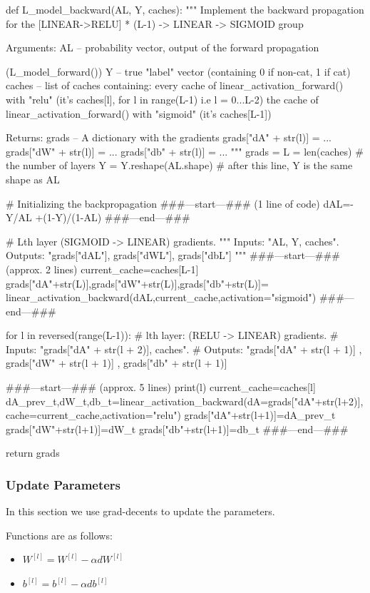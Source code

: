 \documentclass[12pt,a4paper]{article}
\begin{document}
		\begin{python}
			def L_model_backward(AL, Y, caches):
			"""
			Implement the backward propagation for the [LINEAR->RELU] * (L-1) -> LINEAR -> SIGMOID group
			
			Arguments:
			AL -- probability vector, output of the forward propagation 
			
			(L_model_forward())
			Y -- true "label" vector (containing 0 if non-cat, 1 if cat)
			caches -- list of caches containing:
			every cache of linear_activation_forward() with "relu" 
			(it's caches[l], for l in range(L-1) i.e l = 0...L-2)
			the cache of linear_activation_forward() with "sigmoid" 
			(it's caches[L-1])
			
			Returns:
			grads -- A dictionary with the gradients
			grads["dA" + str(l)] = ...
			grads["dW" + str(l)] = ...
			grads["db" + str(l)] = ...
			"""
			grads = {}
			L = len(caches) # the number of layers
			Y = Y.reshape(AL.shape) # after this line, Y is the same shape as AL
			
			# Initializing the backpropagation
			###---start---### (1 line of code)
			dAL=-Y/AL +(1-Y)/(1-AL)
			###---end---###
			
			# Lth layer (SIGMOID -> LINEAR) gradients. """
			Inputs: "AL, Y, caches". 
			Outputs: "grads["dAL"], grads["dWL"], grads["dbL"]
			"""
			###---start---### (approx. 2 lines)
			current_cache=caches[L-1]
			grads["dA"+str(L)],grads["dW"+str(L)],grads["db"+str(L)]=
			linear_activation_backward(dAL,current_cache,activation="sigmoid")
			###---end---###
			
			for l in reversed(range(L-1)):
			# lth layer: (RELU -> LINEAR) gradients.
			# Inputs: "grads["dA" + str(l + 2)], caches". 
			# Outputs: "grads["dA" + str(l + 1)] , grads["dW" + str(l + 1)] , grads["db" + str(l + 1)]
			
			###---start---### (approx. 5 lines)
			print(l)
			current_cache=caches[l]
			dA_prev_t,dW_t,db_t=linear_activation_backward(dA=grads["dA"+str(l+2)],cache=current_cache,activation="relu")
			grads["dA"+str(l+1)]=dA_prev_t
			grads["dW"+str(l+1)]=dW_t
			grads["db"+str(l+1)]=db_t        
			###---end---###
			
			return grads
		\end{python}
		\subsubsection{Update Parameters}
		In this section we use grad-decents to update the parameters.\par Functions are as follows:\par
		\begin{itemize}
			\item $W^{[l]}=W^{[l]}−α dW^{[l]}    $
			\item $b^{[l]}=b^{[l]}−α db^{[l]}    $
		\end{itemize}
\end{document}
